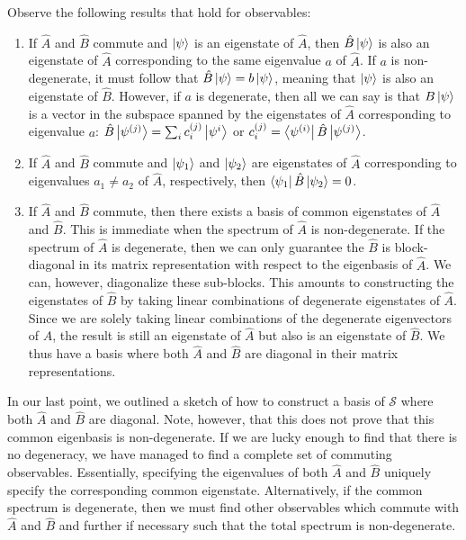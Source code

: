 Observe the following results that hold for observables:
\begin{enumerate}
    \item If $\hat{A}$ and $\hat{B}$ commute and $\ket{\psi}$ is an eigenstate of $\hat{A}$, then $\hat{B} \ket{\psi}$ is also an eigenstate of $\hat{A}$ corresponding to the same eigenvalue $a$ of $\hat{A}$. If $a$ is non-degenerate, it must follow that $\hat{B} \ket{\psi} = b \ket{\psi}$, meaning that $\ket{\psi}$ is also an eigenstate of $\hat{B}$. However, if $a$ is degenerate, then all we can say is that $B \ket{\psi}$ is a vector in the subspace spanned by the eigenstates of $\hat{A}$ corresponding to eigenvalue $a$: $\hat{B} \ket{\psi^{(j)}} = \sum_{i} c_{i}^{(j)} \ket{\psi^{i}}$ or $c_{i}^{(j)} = \bra{\psi^{(i)}} \hat{B} \ket{\psi^{(j)}}$.

    \item If $\hat{A}$ and $\hat{B}$ commute and $\ket{\psi_1}$ and $\ket{\psi_2}$ are eigenstates of $\hat{A}$ corresponding to eigenvalues $a_1 \ne a_2$ of $\hat{A}$, respectively, then $\bra{\psi_1}\hat{B}\ket{\psi_2} = 0$.

    \item If $\hat{A}$ and $\hat{B}$ commute, then there exists a basis of common eigenstates of $\hat{A}$ and $\hat{B}$. This is immediate when the spectrum of $\hat{A}$ is non-degenerate. If the spectrum of $\hat{A}$ is degenerate, then we can only guarantee the $\hat{B}$ is block-diagonal in its matrix representation with respect to the eigenbasis of $\hat{A}$. We can, however, diagonalize these sub-blocks. This amounts to constructing the eigenstates of $\hat{B}$ by taking linear combinations of degenerate eigenstates of $\hat{A}$. Since we are solely taking linear combinations of the degenerate eigenvectors of $\hat{A}$, the result is still an eigenstate of $\hat{A}$ but also is an eigenstate of $\hat{B}$. We thus have a basis where both $\hat{A}$ and $\hat{B}$ are diagonal in their matrix representations.
\end{enumerate}
In our last point, we outlined a sketch of how to construct a basis of $\mathcal{S}$ where both $\hat{A}$ and $\hat{B}$ are diagonal.
Note, however, that this does not prove that this common eigenbasis is non-degenerate.
If we are lucky enough to find that there is no degeneracy, we have managed to find a complete set of commuting observables.
Essentially, specifying the eigenvalues of both $\hat{A}$ and $\hat{B}$ uniquely specify the corresponding common eigenstate.
Alternatively, if the common spectrum is degenerate, then we must find other observables which commute with $\hat{A}$ and $\hat{B}$ and further if necessary such that the total spectrum is non-degenerate.

